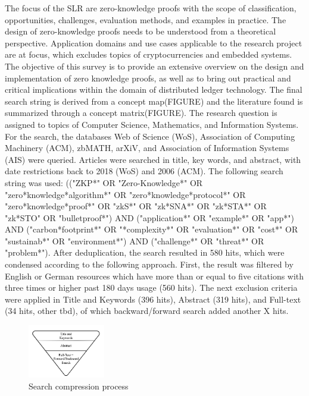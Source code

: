 The focus of the SLR are zero-knowledge proofs with the scope of classification, opportunities, challenges, evaluation methods, and examples in practice. The design of zero-knowledge proofs needs to be understood from a theoretical perspective. Application domains and use cases applicable to the research project are at focus, which excludes topics of cryptocurrencies and embedded systems. The objective of this survey is to provide an extensive overview on the design and implementation of zero knowledge proofs, as well as to bring out practical and critical implications within the domain of distributed ledger technology. The final search string is derived from a concept map(FIGURE) and the literature found is summarized through a concept matrix(FIGURE). The research question is assigned to topics of Computer Science, Mathematics, and Information Systems. For the search, the databases Web of Science (WoS), Association of Computing Machinery (ACM), zbMATH, arXiV, and Association of Information Systems (AIS) were queried. Articles were searched in title, key words, and abstract, with date restrictions back to 2018 (WoS) and 2006 (ACM). The following search string was used: (("ZKP*" OR "Zero-Knowledge*" OR "zero*knowledge*algorithm*" OR "zero*knowledge*protocol*" OR "zero*knowledge*proof*" OR "zkS*" OR "zk*SNA*" OR "zk*STA*" OR "zk*STO" OR "bulletproof*") AND ("application*" OR "example*" OR "app*") AND ("carbon*footprint*" OR "*complexity*" OR "evaluation*" OR "cost*" OR "sustainab*" OR "environment*") AND ("challenge*" OR "threat*" OR "problem*"). After deduplication, the search resulted in 580 hits, which were condensed according to the following approach. First, the result was filtered by English or German resources which have more than or equal to five citations with three times or higher past 180 days usage (560 hits). The next exclusion criteria were applied in Title and Keywords (396 hits), Abstract (319 hits), and Full-text (34 hits, other tbd), of which backward/forward search added another X hits. 

\begin{figure}[hbt]
	\centering
		\includegraphics[width=0.3\textwidth]{Pictures/slr.png}
	\caption{Search compression process}
	\label{fig:slr}
\end{figure}

